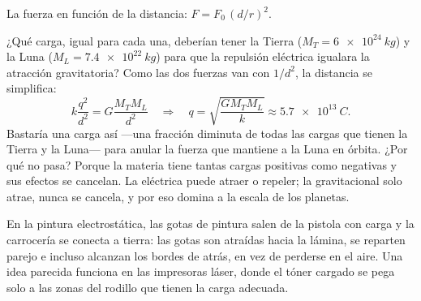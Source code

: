\documentclass[11pt]{article}
\begin{document}
\begin{center}

{\small La fuerza en función de la distancia: $F = F_0\,(d/r)^2$.}
\end{center}

\begin{ejemplo}
¿Qué carga, igual para cada una, deberían tener la Tierra
($M_T = \qty{6e24}{kg}$) y la Luna ($M_L = \qty{7,4e22}{kg}$) para que la
repulsión eléctrica igualara la atracción gravitatoria? Como las dos fuerzas
van con $1/d^{2}$, la distancia se simplifica:
\[
  k\frac{q^2}{d^2} = G\frac{M_T M_L}{d^2} \quad\Rightarrow\quad
  q = \sqrt{\frac{G M_T M_L}{k}} \approx \qty{5,7e13}{C}.
\]
Bastaría una carga así ---una fracción diminuta de todas las cargas que tienen
la Tierra y la Luna--- para anular la fuerza que mantiene a la Luna en órbita. ¿Por qué no pasa? Porque la materia tiene tantas
cargas positivas como negativas y sus efectos se cancelan. La eléctrica puede
atraer o repeler; la gravitacional solo atrae, nunca se cancela, y por eso
domina a la escala de los planetas.
\end{ejemplo}

\begin{aplicacion}
En la pintura electrostática, las gotas de pintura salen de la pistola con
carga y la carrocería se conecta a tierra: las gotas son atraídas hacia la
lámina, se reparten parejo e incluso alcanzan los bordes de atrás, en vez de
perderse en el aire. Una idea parecida funciona en las impresoras láser, donde
el tóner cargado se pega solo a las zonas del rodillo que tienen la carga
adecuada.
\end{aplicacion}
\end{document}
